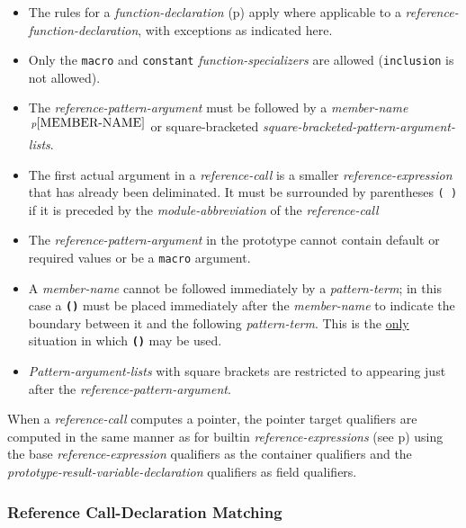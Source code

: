 \documentclass[12pt]{article}
\newcommand{\TT}[1]{{\tt \bfseries #1}}
\newcommand{\pagref}[1]{p\pageref{#1}}
\newcommand{\pagnote}[1]{$\,^{p\pageref{#1}}$}
\begin{document}
\begin{itemize}
\item
The rules for a {\em function-declaration}
(\pagref{FUNCTION-DECLARATION-RULES})
apply where applicable to a {\em reference-func\-tion-declaration},
with exceptions as indicated here.
\item Only the {\tt macro} and {\tt constant} {\em function-specializers}
are allowed ({\tt inclusion} is not allowed).
\item
The {\em reference-pattern-argument} must be
followed by
a {\em member-name}\pagnote{MEMBER-NAME} or square-bracketed
{\em square-bracketed-pattern-argument-lists}.
\item
The first actual argument in a {\em reference-call} is a
smaller {\em reference-expression} that has already been deliminated.
It must be surrounded by parentheses {\tt (~)} if it is preceded by
the {\em module-abbreviation} of the {\em reference-call}
\item
The {\em reference-pattern-argument} in the prototype cannot
contain default or required values or be a {\tt macro} argument.
\item
A {\em member-name} cannot be followed immediately by a {\em pattern-term};
in this case a \TT{()} must be placed immediately after the {\em member-name}
to indicate the boundary between it and the following {\em pattern-term}.
This is the \underline{only} situation in which \TT{()} may be used.
\item
{\em Pattern-argument-lists} with square brackets are restricted to
appearing just after the {\em reference-pattern-argument}.
\end{itemize}

When a {\em reference-call} computes a pointer, the pointer target
qualifiers are computed in the same manner as for builtin
{\em reference-expressions} (see \pagref{QUALIFIER-COMPUTATION})
using the base {\em reference-expression} qualifiers as the
container qualifiers and the {\em prototype-result-variable-declaration}
qualifiers as field qualifiers.

\subsubsection{Reference Call-Declaration Matching}
\label{REFERENCE-CALL-DECLARATION-MATCHING}
\end{document}

